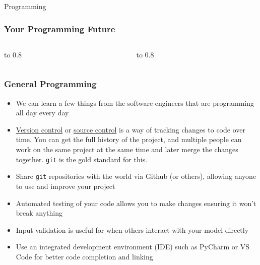 \documentclass[handout, 11pt]{beamer}
\begin{document}
\begin{section}{Programming}
\begin{frame}
\frametitle{Your Programming Future}
\begin{columns}
\begin{column}{0.5\textwidth}
\vbox to 0.8
\end{column}
\begin{column}{0.5\textwidth}
\vbox to 0.8
\end{column}
\end{columns}
\end{frame}
\begin{frame}
\frametitle{General Programming}
\begin{itemize}
\small
\vfill
\item We can learn a few things from the software engineers that are programming all day every day
\vfill
\item \underline{Version control}
or
\underline{source control}
is a way of tracking
changes to code over time. You can get the full history of the project, and multiple
people can work on the same project at the same time and later merge the changes together.
\texttt{git}
is the gold standard for this.
\vfill
\item Share
\texttt{git}
repositories with the world via Github (or others), allowing anyone to use and improve your project
\vfill
\item Automated testing of your code allows you to make changes ensuring it won't break anything
\vfill
\item Input validation is useful for when others interact with your model directly
\vfill
\item Use an integrated development environment (IDE) such as PyCharm or VS Code for better code completion and linking

\end{itemize}
\end{frame}
\end{section}
\end{document}
